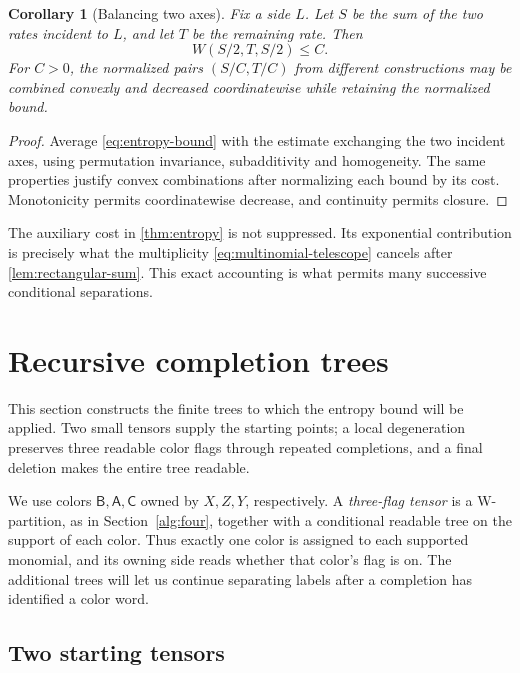 \documentclass[11pt]{article}
\numberwithin{equation}{section}
\newtheorem{corollary}[theorem]{Corollary}
\theoremstyle{definition}
\theoremstyle{remark}
\newcommand{\colA}{\mathsf A}
\newcommand{\colB}{\mathsf B}
\newcommand{\colC}{\mathsf C}
\begin{document}
\begin{corollary}[Balancing two axes]\label{cor:balance}
Fix a side \(L\).
Let \(S\) be the sum of the two rates incident to \(L\), and let \(T\)
be the remaining rate.  Then
\begin{equation}\label{eq:balanced-rate}
 W(S/2,T,S/2)\le C.
\end{equation}
For \(C>0\), the normalized pairs \((S/C,T/C)\) from different constructions
may be combined convexly and decreased coordinatewise while retaining
the normalized bound.
\end{corollary}

\begin{proof}
Average \eqref{eq:entropy-bound} with the estimate exchanging the two
incident axes, using permutation invariance, subadditivity and
homogeneity.  The same properties justify convex combinations after
normalizing each bound by its cost.  Monotonicity permits coordinatewise
decrease, and continuity permits closure.
\end{proof}

The auxiliary cost in \cref{thm:entropy} is not suppressed.
Its exponential contribution is precisely what the multiplicity
\eqref{eq:multinomial-telescope} cancels after
\cref{lem:rectangular-sum}.
This exact accounting is what permits many successive conditional
separations.

\section{Recursive completion trees}\label{sec:completion}

This section constructs the finite trees to which the entropy bound
will be applied.  Two small tensors supply the starting points;
a local degeneration preserves three readable color flags through
repeated completions, and a final deletion makes the entire tree
readable.

We use colors \(\colB,\colA,\colC\) owned by \(X,Z,Y\), respectively.
A \emph{three-flag tensor} is a W-partition, as in
Section~\ref{alg:four}, together with a conditional readable tree on
the support of each color.  Thus exactly one color is assigned to
each supported monomial, and its owning side reads whether that
color's flag is on.  The additional trees will let us continue
separating labels after a completion has identified a color word.

\subsection{Two starting tensors}
\end{document}
